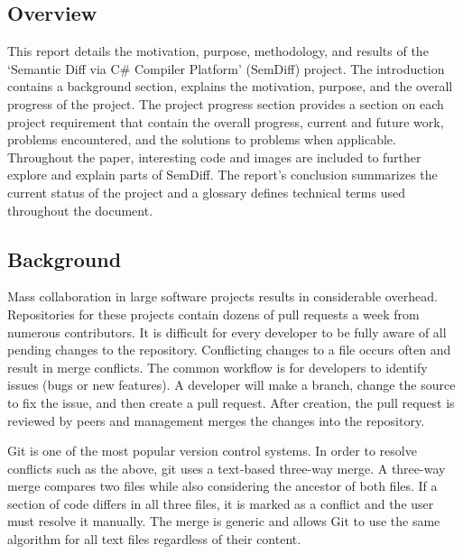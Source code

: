 \documentclass[draftclsnofoot,onecolumn]{IEEEtran}
\begin{document}
\subsection{Overview}%

This report details the motivation, purpose, methodology, and results of the 
`Semantic Diff via C\# Compiler Platform' (SemDiff) project. The introduction 
contains a background section, explains the motivation, purpose, and the 
overall progress of the project. The project progress section provides a
section on each project requirement that contain the overall progress, current 
and future work, problems encountered, and the solutions to problems when 
applicable. Throughout the paper, interesting code and images are included to 
further explore and explain parts of SemDiff. The report's conclusion 
summarizes the current status of the project and a glossary defines technical 
terms used throughout the document.

\subsection{Background}%

Mass collaboration in large software projects results in considerable 
overhead. Repositories for these projects contain dozens of pull requests a 
week from numerous contributors. It is difficult for every developer to be 
fully aware of all pending changes to the repository. Conflicting changes to a 
file occurs often and result in merge conflicts. The common workflow is for 
developers to identify issues (bugs or new features). A developer will make 
a branch, change the source to fix the issue, and then create a pull request. 
After creation, the pull request is reviewed by peers and management merges the 
changes into the repository.

Git is one of the most popular version control systems. In order to resolve 
conflicts such as the above, git uses a text-based three-way merge. A 
three-way merge compares two files while also considering the ancestor of 
both files. If a section of code differs in all three files, it is marked as a 
conflict and the user must resolve it manually. The merge is generic and 
allows Git to use the same algorithm for all text files regardless of their 
content.
\end{document}
